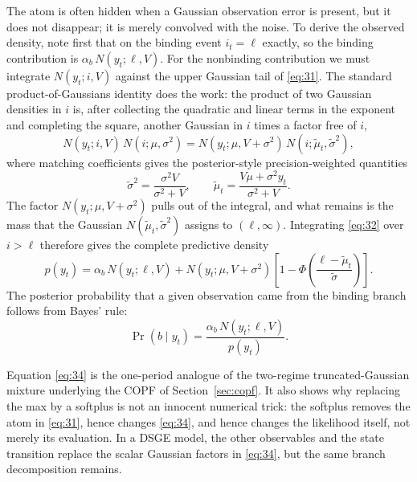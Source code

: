 \documentclass[11pt]{article}
\begin{document}
The atom is often hidden when a Gaussian observation error is present, but it
does not disappear; it is merely convolved with the noise. To derive the
observed density, note first that on the binding event $i_t=\ell$ exactly, so
the binding contribution is $\alpha_b\,N(y_t;\ell,V)$. For the nonbinding
contribution we must integrate $N(y_t;i,V)$ against the upper Gaussian tail
of \eqref{eq:31}. The standard product-of-Gaussians identity does the work:
the product of two Gaussian densities in $i$ is, after collecting the
quadratic and linear terms in the exponent and completing the square, another
Gaussian in $i$ times a factor free of $i$,
\begin{equation}\label{eq:32}
 N(y_t;i,V)\,N(i;\mu,\sigma^2)
 =N(y_t;\mu,V+\sigma^2)\,N(i;\widetilde\mu_t,\widetilde\sigma^2),
\end{equation}
where matching coefficients gives the posterior-style precision-weighted
quantities
\begin{equation}\label{eq:33}
 \widetilde\sigma^2=\frac{\sigma^2V}{\sigma^2+V},
 \qquad
 \widetilde\mu_t=\frac{V\mu+\sigma^2y_t}{\sigma^2+V}.
\end{equation}
The factor $N(y_t;\mu,V+\sigma^2)$ pulls out of the integral, and what
remains is the mass that the Gaussian $N(\widetilde\mu_t,\widetilde\sigma^2)$
assigns to $(\ell,\infty)$. Integrating \eqref{eq:32} over $i>\ell$ therefore
gives the complete predictive density
\begin{equation}\label{eq:34}
 p(y_t)=
 \alpha_b\,N(y_t;\ell,V)
 +N(y_t;\mu,V+\sigma^2)
  \left[1-\Phi\!\left(
   \frac{\ell-\widetilde\mu_t}{\widetilde\sigma}\right)\right].
\end{equation}
The posterior probability that a given observation came from the binding
branch follows from Bayes' rule:
\begin{equation}\label{eq:35}
 \Pr(b\mid y_t)=
 \frac{\alpha_b\,N(y_t;\ell,V)}{p(y_t)}.
\end{equation}

Equation \eqref{eq:34} is the one-period analogue of the two-regime
truncated-Gaussian mixture underlying the COPF of
Section~\ref{sec:copf}. It also shows why replacing the max by a softplus is
not an innocent numerical trick: the softplus removes the atom in
\eqref{eq:31}, hence changes \eqref{eq:34}, and hence changes the likelihood
itself, not merely its evaluation. In a DSGE model, the other observables and
the state transition replace the scalar Gaussian factors in \eqref{eq:34},
but the same branch decomposition remains.
\end{document}
